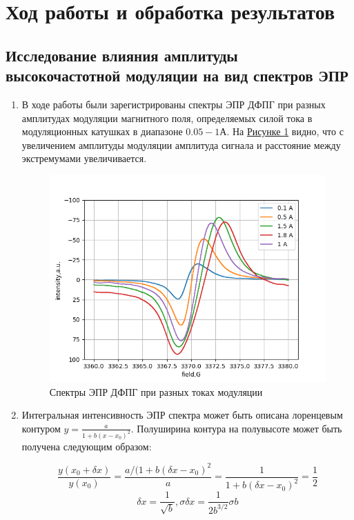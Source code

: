 \documentclass{article}
\begin{document}
\section{Ход работы и обработка результатов}

\subsection{Исследование влияния амплитуды высокочастотной модуляции на вид спектров ЭПР}
\begin{enumerate}
    \item В ходе работы были зарегистрированы спектры ЭПР ДФПГ при разных амплитудах модуляции магнитного поля, определяемых силой тока в модуляционных катушках в диапазоне $0.05 - 1 А$. На \hyperref[1_all]{Рисунке \ref*{1_all}} видно, что с увеличением амплитуды модуляции амплитуда сигнала и расстояние между экстремумами увеличивается. 

\begin{figure}[h!]
        \centering
        \includegraphics[scale = 0.9]{1/1_all.png}
        \caption{Спектры ЭПР ДФПГ при разных токах модуляции}
        \label{1_all}
    \end{figure}
    \item Интегральная интенсивность ЭПР спектра может быть описана лоренцевым контуром $y=\frac{a}{1+b(x-x_0)^2}$. Полуширина контура на полувысоте может быть получена следующим образом:
    
\begin{equation*}
    \frac{y(x_0+\delta x)}{y(x_0)} = \frac{a/(1+b(\delta x-x_0)^2}{a} = \frac{1}{1+b(\delta x-x_0)^2} = \frac{1}{2}
\end{equation*}
\begin{equation*}
    \delta x = \frac{1}{\sqrt{b}}, \sigma \delta x = \frac{1}{2b^{3/2}}\sigma b
\end{equation*}
   

\end{enumerate}
\end{document}
